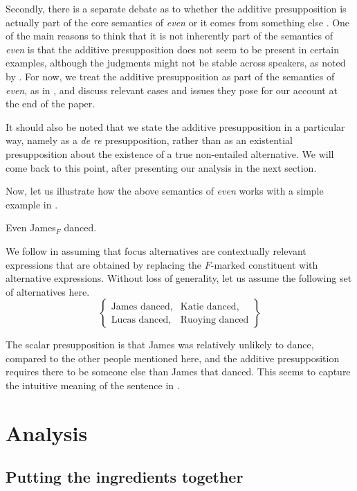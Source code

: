 \documentclass[output=paper]{langscibook}
\begin{document}
Secondly, there is a separate debate as to whether the additive presupposition is actually part of the core semantics of \textit{even} or it  comes from something else \citep{rullmann, crnic, francis}. One of the main reasons to think that it is not inherently part of the semantics of \textit{even} is that the additive presupposition does not seem to be present in certain examples, although the judgments might not be stable across speakers, as noted by \citet{francis}. For now, we treat the additive presupposition as part of the semantics of \textit{even}, as in , and discuss relevant cases and issues they pose for our account at the end of the paper.

It should also be noted that we state the additive presupposition in a particular way, namely as a \textit{de re} presupposition, rather than as an existential presupposition about the existence of a true non-entailed alternative. We will come back to this point, after presenting our analysis in the next section.

Now, let us illustrate how the above semantics of \textit{even} works with a simple example in .

    \ea Even James$_F$ danced.\label{don-sud:dance}
    \z

\noindent We follow \citet{foxkatzir} in assuming that focus alternatives are contextually relevant expressions that are obtained by replacing the $F$-marked constituent with alternative expressions. Without loss of generality, let us assume the following set of alternatives here.
     \[\left\{\begin{array}{ll}
    \text{James danced}, & \text{Katie danced},\\
    \text{Lucas danced}, & \text{Ruoying danced}\end{array}\right\}\]

\noindent The scalar presupposition is that James was relatively unlikely to dance, compared to the other people mentioned here, and the additive presupposition requires there to be someone else than James that danced. This seems to capture the intuitive meaning of the sentence in .


\section{Analysis}
\label{don-sud:sec:analysis}

\subsection{Putting the ingredients together}
\end{document}
